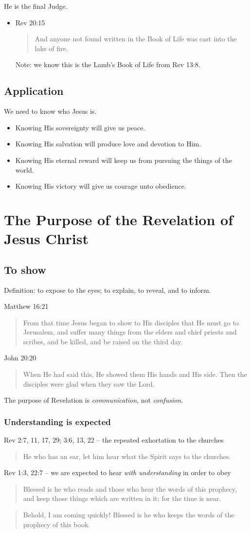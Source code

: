 \documentclass[12pt]{article}
\newcommand{\BI}{\begin{itemize}}
\newcommand{\EI}{\end{itemize}}
\newcommand{\I}{\item}
\newcommand{\Q}[1]{\begin{quote} #1 \end{quote}}
\begin{document}
\I He is the final Judge.
\BI \I Rev 20:15 \Q{And anyone not found written in the Book of Life was cast 
                into the lake of fire.}
            Note: we know this is the Lamb's Book of Life from Rev 13:8. \EI

\subsection{Application}
\I We need to know who Jesus is.
\BI \I Knowing His sovereignty will give us peace.
    \I Knowing His salvation will produce love and devotion to Him.
    \I Knowing His eternal reward will keep us from pursuing the things of
        the world.
    \I Knowing His victory will give us courage unto obedience. \EI

\section{The Purpose of the Revelation of Jesus Christ}
\subsection{To show}
\I Definition: to expose to the eyes; to explain, to reveal, and to inform.
\I Matthew 16:21 \Q{From that time Jesus began to show to His disciples
                    that He must go to Jerusalem, and suffer many things from
                    the elders and chief priests and scribes, and be killed,
                    and be raised on the third day.}
\I John 20:20 \Q{When He had said this, He showed them His hands and His side.
                Then the disciples were glad when they saw the Lord.}
\I The purpose of Revelation is \emph{communication}, not \emph{confusion}.
\subsubsection{Understanding is expected}
\I Rev 2:7, 11, 17, 29; 3:6, 13, 22 -- the repeated exhortation to the churches
    \Q{He who has an ear, let him hear what the Spirit says to the churches.}
\I Rev 1:3, 22:7 -- we are expected to hear \emph{with understanding} in order
    to obey
    \Q{Blessed is he who reads and those who hear the words of this prophecy,
    and keep those things which are written in it; for the time is near.}
    \Q{Behold, I am coming quickly! Blessed is he who keeps the words 
    of the prophecy of this book.}
\end{document}
